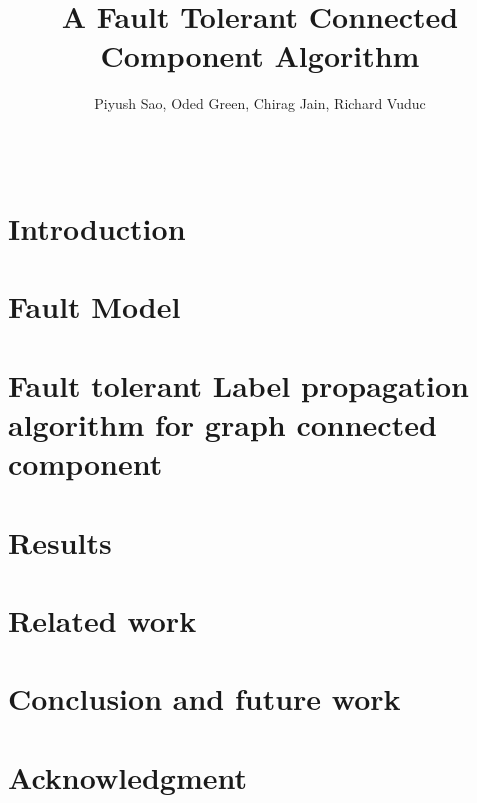 \documentclass[english]{sig-alternate-05-2015}
\theoremstyle{plain}
\theoremstyle{definition}
\begin{document}

\title{A Fault Tolerant Connected Component Algorithm }

  \author{
  \alignauthor
    Piyush Sao, Oded Green, Chirag Jain, Richard Vuduc \\
      \\
      \\
  }


\maketitle





\section{Introduction}

\label{sec:intro}

\section{Fault Model}

\label{sec:fault}

\section{Fault tolerant Label propagation algorithm for graph connected component}

\label{sec:connected}

\section{Results}

\label{sec:results}

\section{Related work}

\label{sec:related}

\section{Conclusion and future work}

\label{sec:conclusion}

\section{Acknowledgment}

\end{document}
